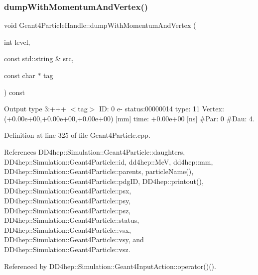\hypertarget{class_d_d4hep_1_1_simulation_1_1_geant4_particle_handle_a2ae8725058b13c12872b5c59607a62e6}{}\label{class_d_d4hep_1_1_simulation_1_1_geant4_particle_handle_a2ae8725058b13c12872b5c59607a62e6} 
\subsubsection{\texorpdfstring{dump\+With\+Momentum\+And\+Vertex()}{dumpWithMomentumAndVertex()}}
{\footnotesize\ttfamily void Geant4\+Particle\+Handle\+::dump\+With\+Momentum\+And\+Vertex (\begin{DoxyParamCaption}\item[{int}]{level,  }\item[{const std\+::string \&}]{src,  }\item[{const char $\ast$}]{tag }\end{DoxyParamCaption}) const}



Output type 3\+:+++ $<$tag$>$ ID\+: 0 e-\/ status\+:00000014 type\+: 11 Vertex\+:(+0.00e+00,+0.00e+00,+0.00e+00) \mbox{[}mm\mbox{]} time\+: +0.00e+00 \mbox{[}ns\mbox{]} \#Par\+: 0 \#Dau\+: 4. 



Definition at line 325 of file Geant4\+Particle.\+cpp.



References D\+D4hep\+::\+Simulation\+::\+Geant4\+Particle\+::daughters, D\+D4hep\+::\+Simulation\+::\+Geant4\+Particle\+::id, dd4hep\+::\+MeV, dd4hep\+::mm, D\+D4hep\+::\+Simulation\+::\+Geant4\+Particle\+::parents, particle\+Name(), D\+D4hep\+::\+Simulation\+::\+Geant4\+Particle\+::pdg\+ID, D\+D4hep\+::printout(), D\+D4hep\+::\+Simulation\+::\+Geant4\+Particle\+::psx, D\+D4hep\+::\+Simulation\+::\+Geant4\+Particle\+::psy, D\+D4hep\+::\+Simulation\+::\+Geant4\+Particle\+::psz, D\+D4hep\+::\+Simulation\+::\+Geant4\+Particle\+::status, D\+D4hep\+::\+Simulation\+::\+Geant4\+Particle\+::vsx, D\+D4hep\+::\+Simulation\+::\+Geant4\+Particle\+::vsy, and D\+D4hep\+::\+Simulation\+::\+Geant4\+Particle\+::vsz.



Referenced by D\+D4hep\+::\+Simulation\+::\+Geant4\+Input\+Action\+::operator()().

